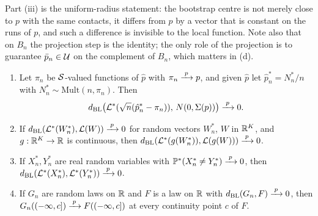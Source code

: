 Part (iii) is the uniform-radius statement: the bootstrap centre is not merely close to $p$ with the same contacts, it differs from $p$ by a vector that is constant on the runs of $p$, and such a difference is invisible to the local function. Note also that on $B_n$ the projection step is the identity; the only role of the projection is to guarantee $\bar p_n\in\mathcal{U}$ on the complement of $B_n$, which matters in (d).

\begin{lemma}\label{lem:S-cond}
\begin{enumerate}
\item[(i)] Let $\pi_n$ be $\mathcal{S}$-valued functions of $\hat p$ with $\pi_n\xrightarrow{\;p\;} p$, and given $\hat p$ let $\hat p^\ast_n=N^\ast_n/n$ with $N^\ast_n\sim\mathrm{Mult}(n,\pi_n)$. Then
\[
d_{\mathrm{BL}}\bigl(\mathcal{L}^\ast(\sqrt n(\hat p^\ast_n-\pi_n)),\,N(0,\Sigma(p))\bigr)\xrightarrow{\;p\;}0 .
\]
\item[(ii)] If $d_{\mathrm{BL}}(\mathcal{L}^\ast(W^\ast_n),\mathcal{L}(W))\xrightarrow{\;p\;}0$ for random vectors $W^\ast_n$, $W$ in $\mathbb{R}^K$, and $g:\mathbb{R}^K\to\mathbb{R}$ is continuous, then $d_{\mathrm{BL}}(\mathcal{L}^\ast(g(W^\ast_n)),\mathcal{L}(g(W)))\xrightarrow{\;p\;}0$.
\item[(iii)] If $X^\ast_n,Y^\ast_n$ are real random variables with $\mathbb{P}^\ast(X^\ast_n\ne Y^\ast_n)\xrightarrow{\;p\;}0$, then $d_{\mathrm{BL}}(\mathcal{L}^\ast(X^\ast_n),\allowbreak\mathcal{L}^\ast(Y^\ast_n))\xrightarrow{\;p\;}0$.
\item[(iv)] If $G_n$ are random laws on $\mathbb{R}$ and $F$ is a law on $\mathbb{R}$ with $d_{\mathrm{BL}}(G_n,F)\xrightarrow{\;p\;}0$, then $G_n((-\infty,c])\xrightarrow{\;p\;} F((-\infty,c])$ at every continuity point $c$ of $F$.
\end{enumerate}
\end{lemma}

